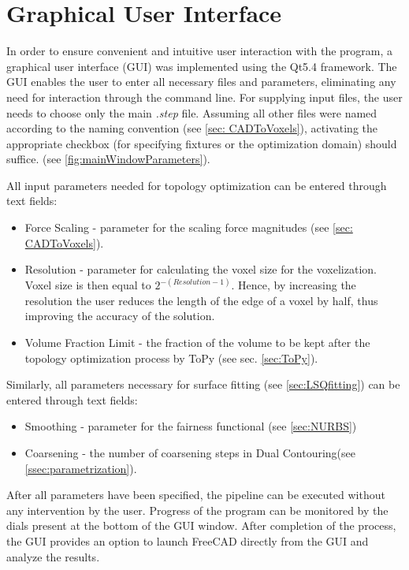 \section{Graphical User Interface}
\label{sec:gui}
In order to ensure convenient and intuitive user interaction with the program, a graphical user interface (GUI) was implemented using the Qt5.4 \cite{Qt} framework. 
The GUI enables the user to enter all necessary files and parameters, eliminating any need for interaction through the command line. For supplying input files, the user needs to choose only the main \textit{.step} file. Assuming all other files were named according to the naming convention (see \autoref{sec: CADToVoxels}), activating the appropriate checkbox (for specifying fixtures or the optimization domain) should suffice. (see \autoref{fig:mainWindowParameters}).

All input parameters needed for topology optimization can be entered through text fields:
\begin{itemize}
\item Force Scaling - parameter for the scaling force magnitudes (see \autoref{sec: CADToVoxels}).
\item Resolution - parameter for calculating the voxel size for the voxelization. Voxel size is then equal to $2^{-(Resolution - 1)}$. Hence, by increasing the resolution the user reduces the length of the edge of a voxel by half, thus improving the accuracy of the solution.
\item Volume Fraction Limit - the fraction of the volume to be kept after the topology optimization process by ToPy (see sec. \ref{sec:ToPy}).

\end{itemize}
Similarly, all parameters necessary for surface fitting (see \autoref{sec:LSQfitting}) can be entered through text fields:
\begin{itemize}
\item Smoothing - parameter for the fairness functional (see \autoref{sec:NURBS})
\item Coarsening - the number of coarsening steps in Dual Contouring(see \autoref{ssec:parametrization}).
\end{itemize}

After all parameters have been specified, the pipeline can be executed without any intervention by the user. Progress of the program can be monitored by the dials present at the bottom of the GUI window. After completion of the process, the GUI provides an option to launch FreeCAD directly from the GUI and analyze the results.

